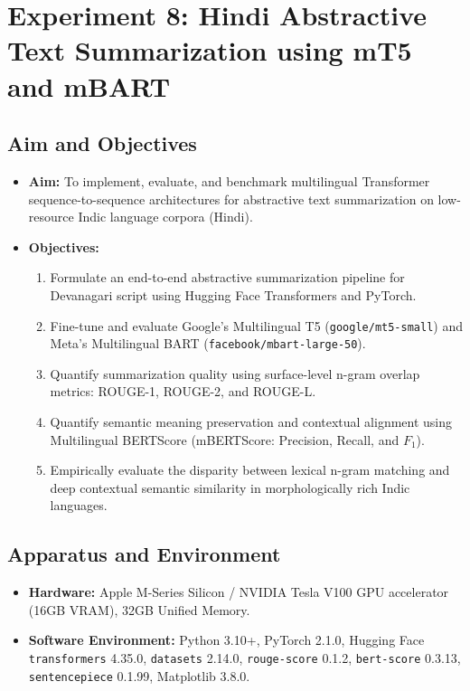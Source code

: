 \chapter{Experiment 8: Hindi Abstractive Text Summarization using mT5 and mBART}

\section{Aim and Objectives}
\begin{itemize}
    \item \textbf{Aim:} To implement, evaluate, and benchmark multilingual Transformer sequence-to-sequence architectures for abstractive text summarization on low-resource Indic language corpora (Hindi).
    \item \textbf{Objectives:}
    \begin{enumerate}
        \item Formulate an end-to-end abstractive summarization pipeline for Devanagari script using Hugging Face Transformers and PyTorch.
        \item Fine-tune and evaluate Google's Multilingual T5 (\texttt{google/mt5-small}) and Meta's Multilingual BART (\texttt{facebook/mbart-large-50}).
        \item Quantify summarization quality using surface-level n-gram overlap metrics: ROUGE-1, ROUGE-2, and ROUGE-L.
        \item Quantify semantic meaning preservation and contextual alignment using Multilingual BERTScore (mBERTScore: Precision, Recall, and $F_1$).
        \item Empirically evaluate the disparity between lexical n-gram matching and deep contextual semantic similarity in morphologically rich Indic languages.
    \end{enumerate}
\end{itemize}

\section{Apparatus and Environment}
\begin{itemize}
    \item \textbf{Hardware:} Apple M-Series Silicon / NVIDIA Tesla V100 GPU accelerator (16GB VRAM), 32GB Unified Memory.
    \item \textbf{Software Environment:} Python 3.10+, PyTorch 2.1.0, Hugging Face \texttt{transformers} 4.35.0, \texttt{datasets} 2.14.0, \texttt{rouge-score} 0.1.2, \texttt{bert-score} 0.3.13, \texttt{sentencepiece} 0.1.99, Matplotlib 3.8.0.
\end{itemize}

